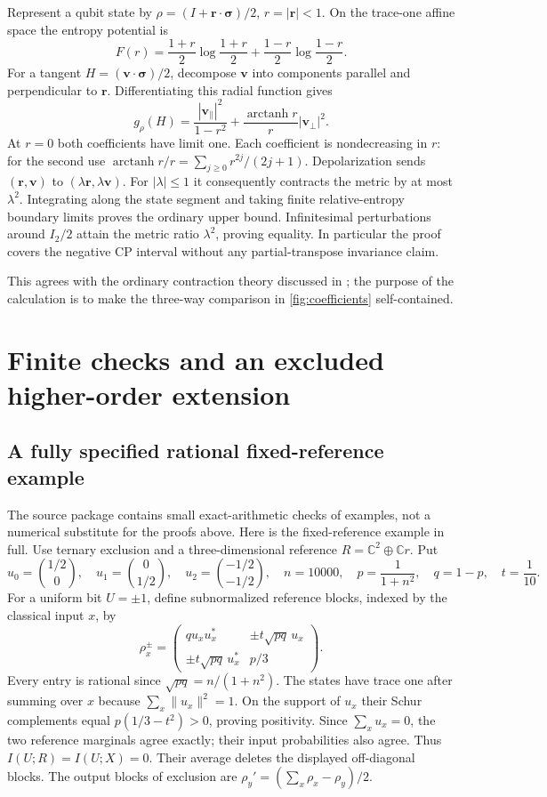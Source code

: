 \documentclass[11pt]{article}
\numberwithin{equation}{section}
\theoremstyle{definition}
\theoremstyle{remark}
\newcommand{\norm}[1]{\lVert #1\rVert}
\begin{document}
Represent a qubit state by
$\rho=(I+\mathbf r\cdot\boldsymbol\sigma)/2$, $r=|\mathbf r|<1$.
On the trace-one affine space the entropy potential is
\[
 F(r)=\frac{1+r}{2}\log\frac{1+r}{2}
      +\frac{1-r}{2}\log\frac{1-r}{2}.
\]
For a tangent $H=(\mathbf v\cdot\boldsymbol\sigma)/2$, decompose
$\mathbf v$ into components parallel and perpendicular to
$\mathbf r$. Differentiating this radial function gives
\[
 g_\rho(H)=
 \frac{|\mathbf v_\parallel|^2}{1-r^2}
 +\frac{\operatorname{arctanh}r}{r}|\mathbf v_\perp|^2.
\]
At $r=0$ both coefficients have limit one.
Each coefficient is nondecreasing in $r$:
for the second use
$\operatorname{arctanh}r/r=\sum_{j\geq0}r^{2j}/(2j+1)$.
Depolarization sends $(\mathbf r,\mathbf v)$ to
$(\lambda\mathbf r,\lambda\mathbf v)$.
For $|\lambda|\leq1$ it consequently contracts the metric by at most
$\lambda^2$. Integrating along the state segment and taking finite
relative-entropy boundary limits proves the ordinary upper bound.
Infinitesimal perturbations around $I_2/2$ attain the metric ratio
$\lambda^2$, proving equality. In particular the proof covers the
negative CP interval without any partial-transpose invariance claim.

This agrees with the ordinary contraction theory discussed in
\cite{HR15}; the purpose of the calculation is to make the three-way
comparison in \cref{fig:coefficients} self-contained.

\section{Finite checks and an excluded higher-order extension}
\label{app:checks}

\subsection{A fully specified rational fixed-reference example}
\label{app:finite-witness}

The source package contains small exact-arithmetic checks of examples, not
a numerical substitute for the proofs above. Here is the fixed-reference
example in full.
Use ternary exclusion and a three-dimensional reference
$R=\mathbb C^2\oplus\mathbb C r$. Put
\[
 u_0=\binom{1/2}{0},\quad u_1=\binom0{1/2},\quad
 u_2=\binom{-1/2}{-1/2},\quad
 n=10000,\quad p=\frac1{1+n^2},\quad q=1-p,\quad t=\frac1{10}.
\]
For a uniform bit $U=\pm1$, define subnormalized reference blocks,
indexed by the classical input $x$, by
\[
 \rho_x^\pm=
 \begin{pmatrix}
 q u_xu_x^*&\pm t\sqrt{pq}\,u_x\\
 \pm t\sqrt{pq}\,u_x^*&p/3
 \end{pmatrix}.
\]
Every entry is rational since $\sqrt{pq}=n/(1+n^2)$.
The states have trace one after summing over $x$ because
$\sum_x\norm{u_x}^2=1$. On the support of $u_x$ their Schur
complements equal $p(1/3-t^2)>0$, proving positivity.
Since $\sum_xu_x=0$, the two reference marginals agree exactly;
their input probabilities also agree. Thus $I(U;R)=I(U;X)=0$.
Their average deletes the displayed off-diagonal blocks.
The output blocks of exclusion are
$\rho_y'=(\sum_x\rho_x-\rho_y)/2$.
\end{document}
